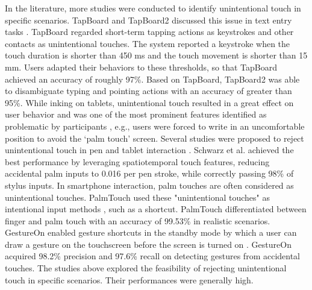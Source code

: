 In the literature, more studies were conducted to identify unintentional touch in specific scenarios. TapBoard and TapBoard2 discussed this issue in text entry tasks \cite{2013-TapBoard,2016-TapBoard2}. TapBoard regarded short-term tapping actions as keystrokes and other contacts as unintentional touches. The system reported a keystroke when the touch duration is shorter than 450 ms and the touch movement is shorter than 15 mm. Users adapted their behaviors to these thresholds, so that TapBoard achieved an accuracy of roughly 97\%. Based on TapBoard, TapBoard2 was able to disambiguate typing and pointing actions with an accuracy of greater than 95\%.
While inking on tablets, unintentional touch resulted in a great effect on user behavior and was one of the most prominent features identified as problematic by participants \cite{2014-PenMightier}, e.g., users were forced to write in an uncomfortable position to avoid the ‘palm touch’ screen. Several studies were proposed to reject unintentional touch in pen and tablet interaction \cite{2013-PalmInput,2014-PenUnint,2014-PalmRejection}. Schwarz et al. achieved the best performance \cite{2014-PalmRejection} by leveraging spatiotemporal touch features, reducing accidental palm inputs to 0.016 per pen stroke, while correctly passing 98\% of stylus inputs.
In smartphone interaction, palm touches are often considered as unintentional touches. PalmTouch used these "unintentional touches" as intentional input methods \cite{2018-PalmTouch}, such as a shortcut. PalmTouch differentiated between finger and palm touch with an accuracy of 99.53\% in realistic scenarios. GestureOn enabled gesture shortcuts in the standby mode by which a user can draw a gesture on the touchscreen before the screen is turned on \cite{2015-GestureOn}. GestureOn acquired 98.2\% precision and 97.6\% recall on detecting gestures from accidental touches.
The studies above explored the feasibility of rejecting unintentional touch in specific scenarios. Their performances were generally high.




